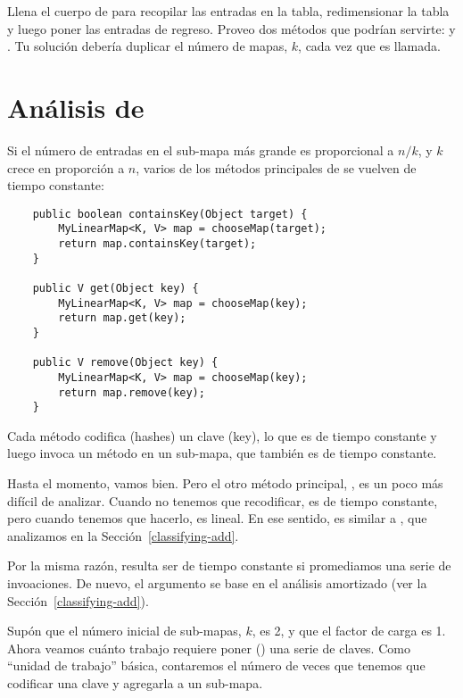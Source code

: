 \documentclass[12pt]{book}
\theoremstyle{exercise}
\begin{document}
Llena el cuerpo de  para recopilar las entradas en la tabla,
redimensionar la tabla y luego poner las entradas de regreso. Proveo dos
métodos que podrían servirte:  y
. Tu solución debería duplicar el número
de mapas, $k$, cada vez que es llamada.


\section{Análisis de }
\label{analyzing-myhashmap}


Si el número de entradas en el sub-mapa más grande es proporcional a
$n/k$, y $k$ crece en proporción a $n$, varios de los métodos
principales de  se vuelven de tiempo constante:

\begin{verbatim}
    public boolean containsKey(Object target) {
        MyLinearMap<K, V> map = chooseMap(target);
        return map.containsKey(target);
    }

    public V get(Object key) {
        MyLinearMap<K, V> map = chooseMap(key);
        return map.get(key);
    }

    public V remove(Object key) {
        MyLinearMap<K, V> map = chooseMap(key);
        return map.remove(key);
    }
\end{verbatim}

Cada método codifica (hashes) un clave (key), lo que es de tiempo
constante y luego invoca un método en un sub-mapa, que también es
de tiempo constante.


Hasta el momento, vamos bien. Pero el otro método principal, , es un
poco más difícil de analizar. Cuando no tenemos que recodificar, es de tiempo
constante,  pero cuando tenemos que hacerlo, es lineal. En ese sentido, es similar
a , que analizamos en la Sección~\ref{classifying-add}.


Por la misma razón,  resulta ser de
tiempo constante si promediamos una serie de invoaciones.
De nuevo, el argumento se base en el análisis amortizado
(ver la Sección~\ref{classifying-add}).


Supón que el número inicial de sub-mapas, $k$, es 2, y que el factor
de carga es 1. Ahora veamos cuánto trabajo requiere poner () una
serie de claves. Como ``unidad de trabajo'' básica, contaremos el número de
veces que tenemos que codificar una clave y agregarla a un sub-mapa.
\end{document}
